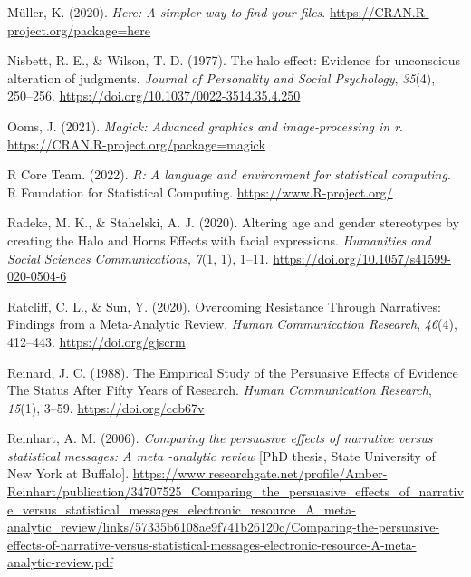\documentclass[
  man, donotrepeattitle,floatsintext]{apa7}
\newlength{\cslhangindent}
\newlength{\cslentryspacingunit} %
\newenvironment{CSLReferences}[2] %
 {%
  \setlength{\parindent}{0pt}
  \ifodd #1
  \let\oldpar\par
  \def\par{\hangindent=\cslhangindent\oldpar}
  \fi
  \setlength{\parskip}{#2\cslentryspacingunit}
 }%
 {}
\theoremstyle{definition}
\theoremstyle{definition}
\theoremstyle{definition}
\theoremstyle{definition}
\theoremstyle{remark}
\begin{document}
\begin{CSLReferences}{1}{0}
\leavevmode{}%
Müller, K. (2020). \emph{Here: A simpler way to find your files}. \url{https://CRAN.R-project.org/package=here}

\leavevmode{}%
Nisbett, R. E., \& Wilson, T. D. (1977). The halo effect: {Evidence} for unconscious alteration of judgments. \emph{Journal of Personality and Social Psychology}, \emph{35}(4), 250--256. \url{https://doi.org/10.1037/0022-3514.35.4.250}

\leavevmode{}%
Ooms, J. (2021). \emph{Magick: Advanced graphics and image-processing in r}. \url{https://CRAN.R-project.org/package=magick}

\leavevmode{}%
R Core Team. (2022). \emph{R: A language and environment for statistical computing}. R Foundation for Statistical Computing. \url{https://www.R-project.org/}

\leavevmode{}%
Radeke, M. K., \& Stahelski, A. J. (2020). Altering age and gender stereotypes by creating the {Halo} and {Horns Effects} with facial expressions. \emph{Humanities and Social Sciences Communications}, \emph{7}(1, 1), 1--11. \url{https://doi.org/10.1057/s41599-020-0504-6}

\leavevmode{}%
Ratcliff, C. L., \& Sun, Y. (2020). Overcoming {Resistance Through Narratives}: {Findings} from a {Meta-Analytic Review}. \emph{Human Communication Research}, \emph{46}(4), 412--443. \url{https://doi.org/gjscrm}

\leavevmode{}%
Reinard, J. C. (1988). The {Empirical Study} of the {Persuasive Effects} of {Evidence The Status After Fifty Years} of {Research}. \emph{Human Communication Research}, \emph{15}(1), 3--59. \url{https://doi.org/ccb67v}

\leavevmode{}%
Reinhart, A. M. (2006). \emph{Comparing the persuasive effects of narrative versus statistical messages: {A} meta -analytic review} {[}PhD thesis, {State University of New York at Buffalo}{]}. \url{https://www.researchgate.net/profile/Amber-Reinhart/publication/34707525_Comparing_the_persuasive_effects_of_narrative_versus_statistical_messages_electronic_resource_A_meta-analytic_review/links/57335b6108ae9f741b26120c/Comparing-the-persuasive-effects-of-narrative-versus-statistical-messages-electronic-resource-A-meta-analytic-review.pdf}


\end{CSLReferences}
\end{document}
